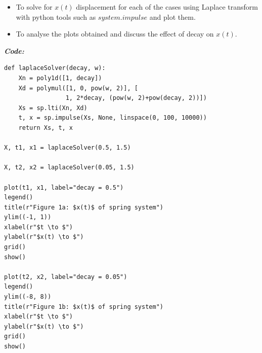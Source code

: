 \documentclass[11pt, a4paper]{article}
\begin{document}
\begin{itemize}

\item
  To solve for \(x(t)\) displacement for each of the cases using Laplace
  transform with python tools such as \(system.impulse\) and plot them.
\item
  To analyse the plots obtained and discuss the effect of decay on
  \(x(t)\).
\end{itemize}
\textit{\textbf{Code:}}
   \begin{lstlisting}
def laplaceSolver(decay, w):
    Xn = poly1d([1, decay])
    Xd = polymul([1, 0, pow(w, 2)], [
                 1, 2*decay, (pow(w, 2)+pow(decay, 2))])
    Xs = sp.lti(Xn, Xd)
    t, x = sp.impulse(Xs, None, linspace(0, 100, 10000))
    return Xs, t, x

X, t1, x1 = laplaceSolver(0.5, 1.5)

X, t2, x2 = laplaceSolver(0.05, 1.5)

plot(t1, x1, label="decay = 0.5")
legend()
title(r"Figure 1a: $x(t)$ of spring system")
ylim((-1, 1))
xlabel(r"$t \to $")
ylabel(r"$x(t) \to $")
grid()
show()

plot(t2, x2, label="decay = 0.05")
legend()
ylim((-8, 8))
title(r"Figure 1b: $x(t)$ of spring system")
xlabel(r"$t \to $")
ylabel(r"$x(t) \to $")
grid()
show()
   \end{lstlisting}
\newpage
\end{document}
